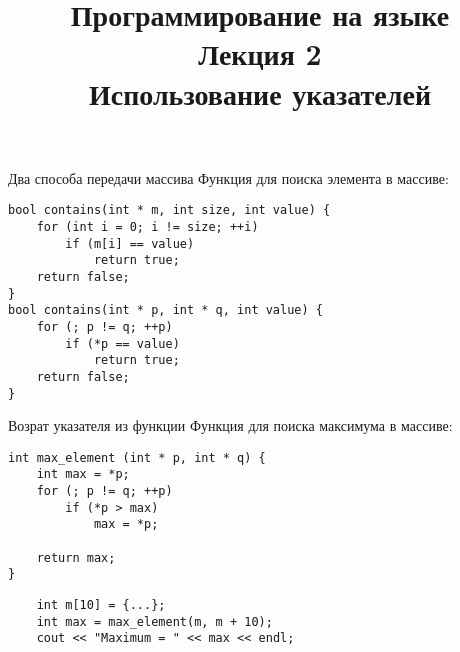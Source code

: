 \documentclass{beamer}
\title{{\bf Программирование на языке \langcpp\protect\\Лекция
2\protect\vspace{1em}\\}Использование указателей}
\begin{document}
\begin{frame} 
  \titlepage
\end{frame}


\begin{frame}[fragile]{Два способа передачи массива}
\small
Функция для поиска элемента в массиве:
\begin{lstlisting}
bool contains(int * m, int size, int value) {
    for (int i = 0; i != size; ++i)
        if (m[i] == value)
            return true;
    return false;
}
bool contains(int * p, int * q, int value) {
    for (; p != q; ++p)
        if (*p == value)
            return true;
    return false;
}
\end{lstlisting}
\vspace{-5mm}
\begin{center}
\end{center}
\end{frame}

\begin{frame}[fragile]{Возрат указателя из функции}
Функция для поиска максимума в массиве:
\begin{lstlisting}
int max_element (int * p, int * q) {
    int max = *p;
    for (; p != q; ++p)
        if (*p > max)
            max = *p;

    return max;
}
\end{lstlisting}
\begin{lstlisting}
    int m[10] = {...};
    int max = max_element(m, m + 10); 
    cout << "Maximum = " << max << endl; 
\end{lstlisting}
\end{frame}
\end{document}
